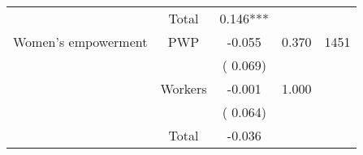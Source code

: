 \begin{tabular}{l*{4}{c}}
\cmidrule{2-3}
                               &       Total           &              0.146***               &   &                                               \\ 
\cmidrule{2-3}
 Women's empowerment                &       PWP     &             -0.055               &        0.370   & 1451                              \\ 
                               &                               &       (       0.069)                     & &                                                                             \\ 
                               &       Workers         &             -0.001               &        1.000   &                                               \\ 
                               &                               &       (       0.064)                     & &                                                                             \\ 
\cmidrule{2-3}
                               &       Total           &             -0.036               &   &                                               \\ 
\cmidrule{2-3}
\hline \end{tabular}                                                                                                              